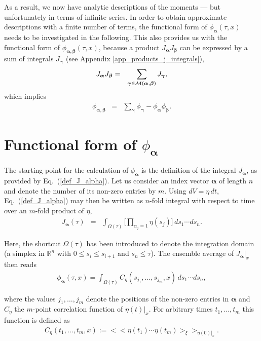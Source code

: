 \documentclass[aps,twocolumn,superscriptaddress,showpacs,showkeys]{revtex4}
\newcommand{\vecalpha}{{\boldsymbol{\alpha}}}
\newcommand{\vecbeta}{{\boldsymbol{\beta}}}
\newcommand{\vecgamma}{{\boldsymbol{\gamma}}}
\begin{document}
\noindent As a result, we now have analytic descriptions of the moments --- but unfortunately in terms of infinite series.
In order to obtain approximate descriptions with a finite number of terms, the functional form of $\phi_\vecalpha(\tau,x)$
needs to be investigated in the following. This also provides us with the functional form of
$\phi_{\vecalpha,\vecbeta}(\tau,x)$, because a product $J_\vecalpha J_\vecbeta$ can be expressed by a sum of integrals
$J_\vecgamma$ (see Appendix \ref{app_products_j_integrals}),
%
\begin{eqnarray}
J_\vecalpha J_\vecbeta &=& \sum_{\vecgamma\in{\cal M}(\vecalpha,\vecbeta)} J_\vecgamma,
\end{eqnarray}
\noindent which implies
%
\begin{eqnarray}\label{phi_ab_by_phi_a}
\phi_{\vecalpha,\vecbeta} &=& \sum_{\vecgamma}\phi_\vecgamma -\phi_\vecalpha\phi_\vecbeta.
\end{eqnarray}


\section{Functional form of $\phi_\vecalpha$}
\label{sec_expectation_J}

\noindent The starting point for the calculation of $\phi_\vecalpha$ is the definition of the integral $J_\vecalpha$, as
provided by Eq.~(\ref{def_J_alpha}). Let us consider an index vector $\vecalpha$ of length $n$ and denote the
number of its non-zero entries by $m$. Using $dV=\eta\,dt$, Eq.~(\ref{def_J_alpha}) may then be written as $n$-fold
integral with respect to time over an $m$-fold product of $\eta$,
%
\begin{eqnarray}
J_{\vecalpha}(\tau) &=&
\int_{\Omega(\tau)} \Big[\prod_{\alpha_j=1}\eta(s_j)\Big] \,ds_1\cdots ds_n.
\end{eqnarray}

\noindent Here, the shortcut $\Omega(\tau)$ has been introduced to denote the integration domain (a simplex
in ${\mathbb R}^n$ with $0\le s_i\le s_{i+1}$ and $s_n\le\tau$).
The ensemble average of $J_\vecalpha\big|_x$ then reads
%
\begin{eqnarray}\label{def_phi_alpha_explicit}
\phi_{\vecalpha}(\tau,x) = \int_{\Omega(\tau)}\!\!\! C_\eta(s_{j_1},\ldots,s_{j_m},x) \,ds_1\cdots ds_n,
\end{eqnarray}

\noindent where the values $j_1,\ldots,j_m$ denote the positions of the non-zero entries in $\vecalpha$ and
$C_\eta$ the $m$-point correlation function of $\eta(t)\big|_x$. For arbitrary times $t_1,\ldots,t_m$ this function is
defined as
%
\begin{eqnarray}\label{def_C_eta}
C_\eta(t_1,\ldots,t_m,x) :=
\big<\big<\eta(t_1)\cdots\eta(t_m)\big>_\xi\big>_{\eta(0)|_x}.
\end{eqnarray}
\end{document}
